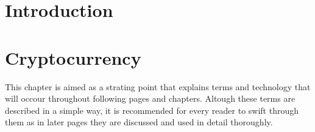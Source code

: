 \documentclass[
  printed, %
  table,   %
  nolof,     %
  nolot,     %
           oneside, color
]{fithesis3}
\begin{document}
\chapter{Introduction}



\chapter{Cryptocurrency}
This chapter is aimed as a strating point that explains terms and technology that will occour throughout following pages and chapters. Altough these terms are described in a simple way, it is recommended for every reader to swift through them as in later pages they are discussed and used in detail thoroughly.
\end{document}
